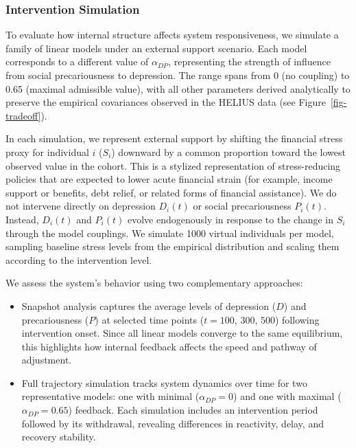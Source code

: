 \documentclass[
]{article}
\begin{document}
\subsubsection{Intervention Simulation}\label{intervention-simulation}

To evaluate how internal structure affects system responsiveness, we
simulate a family of linear models under an external support scenario.
Each model corresponds to a different value of \(\alpha_{DP}\),
representing the strength of influence from social precariousness to
depression. The range spans from 0 (no coupling) to 0.65 (maximal
admissible value), with all other parameters derived analytically to
preserve the empirical covariances observed in the HELIUS data (see
Figure~\ref{fig-tradeoff}).

\textcolor{BrickRed}{In each simulation, we represent external support by shifting the financial stress proxy for individual $i$ ($S_i$) downward by a common proportion toward the lowest observed value in the cohort. This is a stylized representation of stress-reducing policies that are expected to lower acute financial strain (for example, income support or benefits, debt relief, or related forms of financial assistance). We do not intervene directly on depression $D_i(t)$ or social precariousness $P_i(t)$. Instead, $D_i(t)$ and $P_i(t)$ evolve endogenously in response to the change in $S_i$ through the model couplings.}
We simulate 1000 virtual individuals per model, sampling baseline stress
levels from the empirical distribution and scaling them according to the
intervention level.

We assess the system's behavior using two complementary approaches:

\begin{itemize}
\item
  Snapshot analysis captures the average levels of depression (\(D\))
  and precariousness (\(P\)) at selected time points (\(t = 100\),
  \(300\), \(500\)) following intervention onset. Since all linear
  models converge to the same equilibrium, this highlights how internal
  feedback affects the speed and pathway of adjustment.
\item
  Full trajectory simulation tracks system dynamics over time for two
  representative models: one with minimal (\(\alpha_{DP} = 0\)) and one
  with maximal (\(\alpha_{DP} = 0.65\)) feedback. Each simulation
  includes an intervention period followed by its withdrawal, revealing
  differences in reactivity, delay, and recovery stability.
\end{itemize}
\end{document}
